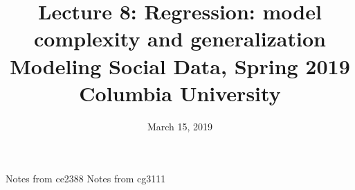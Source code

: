 \documentclass{article}
\title{
Lecture 8: Regression: model complexity and generalization \\  %
Modeling Social Data, Spring 2019 \\   %
Columbia University                    %
}
\date{March 15, 2019}                %
\makeatletter
\let\org@subfile
\renewcommand*{}[1]{%
  \filename@parse{#1}%
  \expandafter
  \graphicspath\expandafter{\expandafter{\filename@area}}%
  \org@subfile{#1}%
}
\makeatother
\begin{document}
\maketitle


\pagebreak \newpage \noindent\Huge{Notes from ce2388} \normalsize \setcounter{section}{0} 
\pagebreak \newpage \noindent\Huge{Notes from cg3111} \normalsize \setcounter{section}{0} 
\end{document}
